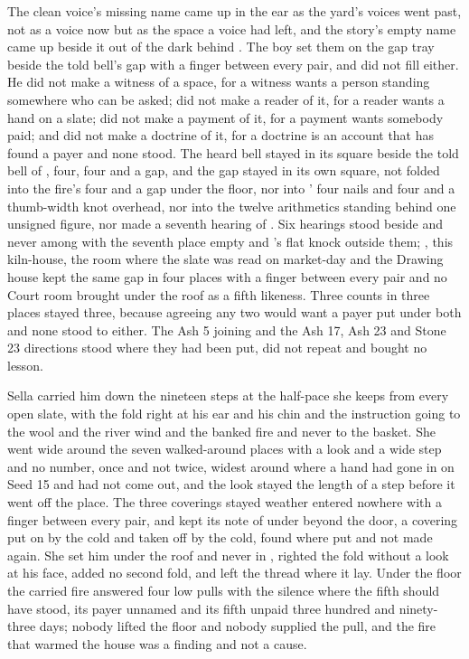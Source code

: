 The clean voice's missing name came up in the ear as the yard's voices went past, not as a voice now but as the space a voice had left, and the story's empty name came up beside it out of the dark behind . The boy set them on the gap tray beside the told bell's gap with a finger between every pair, and did not fill either. He did not make a witness of a space, for a witness wants a person standing somewhere who can be asked; did not make a reader of it, for a reader wants a hand on a slate; did not make a payment of it, for a payment wants somebody paid; and did not make a doctrine of it, for a doctrine is an account that has found a payer and none stood. The heard bell stayed in its square beside the told bell of , four, four and a gap, and the gap stayed in its own square, not folded into the fire's four and a gap under the floor, nor into ' four nails and four and a thumb-width knot overhead, nor into the twelve arithmetics standing behind one unsigned figure, nor made a seventh hearing of . Six hearings stood beside and never among with the seventh place empty and 's flat knock outside them; , this kiln-house, the room where the slate was read on market-day and the Drawing house kept the same gap in four places with a finger between every pair and no Court room brought under the roof as a fifth likeness. Three counts in three places stayed three, because agreeing any two would want a payer put under both and none stood to either. The Ash 5 joining and the Ash 17, Ash 23 and Stone 23 directions stood where they had been put, did not repeat and bought no lesson.

Sella carried him down the nineteen steps at the half-pace she keeps from every open slate, with the fold right at his ear and his chin and the instruction going to the wool and the river wind and the banked fire and never to the basket. She went wide around the seven walked-around places with a look and a wide step and no number, once and not twice, widest around  where a hand had gone in on Seed 15 and had not come out, and the look stayed the length of a step before it went off the place. The three coverings stayed weather entered nowhere with a finger between every pair, and  kept its note of  under  beyond the door, a covering put on by the cold and taken off by the cold, found where put and not made again. She set him under the roof and never in , righted the fold without a look at his face, added no second fold, and left the thread where it lay. Under the floor the carried fire answered four low pulls with the silence where the fifth should have stood, its payer unnamed and its fifth unpaid three hundred and ninety-three days; nobody lifted the floor and nobody supplied the pull, and the fire that warmed the house was a finding and not a cause.

